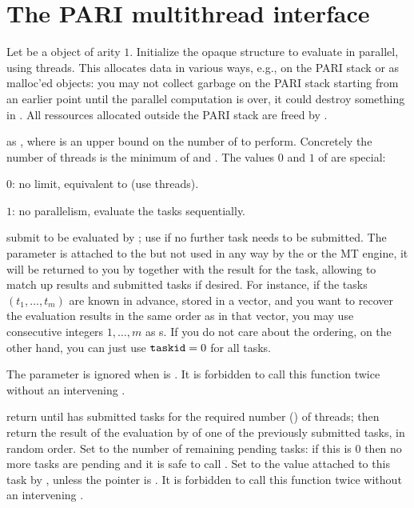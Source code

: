 {\section{The PARI multithread interface}

 Let 
be a  object of arity $1$.  Initialize the opaque structure
 to evaluate  in parallel, using  threads.
This allocates data in
various ways, e.g., on the PARI stack or as malloc'ed objects: you may not
collect garbage on the PARI stack starting from an earlier  point
until the parallel computation is over, it could destroy something in .
All ressources allocated outside the PARI stack are freed by
.

as , where  is an upper bound on the number
of  to perform. Concretely the number of threads is the minimum
of  and . The values $0$ and $1$ of  are
special:

\item $0$: no limit, equivalent to  (use
 threads).

\item $1$: no parallelism, evaluate the tasks sequentially.

 submit
 to be evaluated by ; use  if no
further task needs to be submitted. The parameter  is attached to
the  but not used in any way by the  or the MT engine,
it will be returned to you by  together with the result
for the task, allowing to match up results and submitted tasks if desired.
For instance, if the tasks $(t_1,\dots, t_m)$ are known in advance, stored in
a vector, and you want to recover the evaluation results in the same order as
in that vector, you may use consecutive integers $1, \dots, m$ as
s. If you do not care about the ordering, on the other hand, you
can just use ${\tt taskid} = 0$ for all tasks.

The  parameter is ignored when  is . It is
forbidden to call this function twice without an intervening
.

return  until  has submitted
tasks for the required number () of threads; then return the
result of the evaluation by  of one of the previously submitted
tasks, in random order. Set  to the number of remaining pending
tasks: if this is $0$ then no more tasks are pending and it is safe to call
. Set  to the value attached to this task by
, unless the  pointer is . It is
forbidden to call this function twice without an intervening
.

}
